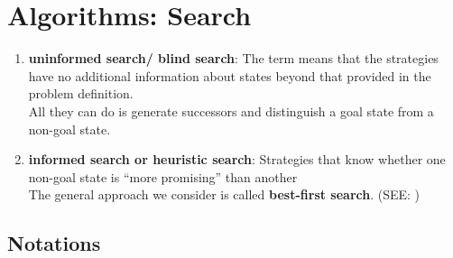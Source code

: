 \chapter{Algorithms: Search}

\begin{enumerate}
    \item \textbf{uninformed search/ blind search}: The term means that the strategies have no additional information about states beyond that provided in the problem definition.\\
    All they can do is generate successors and distinguish a goal state from a non-goal state. 

    \item \textbf{ informed search or heuristic search}: Strategies that know whether one non-goal state is “more promising” than another\\
    The general approach we consider is called \textbf{best-first search}. (SEE: )
\end{enumerate}

\section*{Notations}


